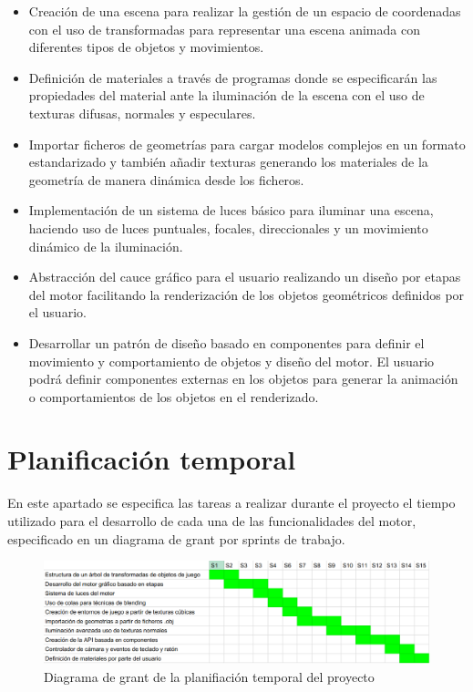 \documentclass[a4paper, 17pt]{book}
\begin{document}
\begin{itemize}
  \item Creación de una escena para realizar la gestión de un espacio de coordenadas con el uso de
  transformadas para representar una escena animada con diferentes tipos de objetos y movimientos.
  
  \item Definición de materiales a través de programas donde se especificarán las propiedades del
  material ante la iluminación de la escena con el uso de texturas difusas, normales y especulares.
  
  \item Importar ficheros de geometrías para cargar modelos complejos en un formato estandarizado
  y también añadir texturas generando los materiales de la geometría de manera dinámica desde los ficheros.
  
  \item Implementación de un sistema de luces básico para iluminar una escena, haciendo uso de luces
  puntuales, focales, direccionales y un movimiento dinámico de la iluminación.
  
  \item Abstracción del cauce gráfico para el usuario realizando un diseño por etapas del motor
  facilitando la renderización de los objetos geométricos definidos por el usuario.
  
  \item Desarrollar un patrón de diseño basado en componentes para definir el movimiento y
  comportamiento de objetos y diseño del motor. El usuario podrá definir componentes 
  externas en los objetos para generar la animación o comportamientos de los objetos en el renderizado.

\end{itemize}

\section{Planificación temporal}
\label{sec:planificacion-temporal}

En este apartado se especifica las tareas a realizar durante el proyecto el tiempo utilizado para el desarrollo de cada una 
de las funcionalidades del motor, especificado en un diagrama de grant por sprints de trabajo. 

\begin{figure}[H]
    \centering
    \includegraphics[scale=0.35, keepaspectratio]{img/Schedule.png}
    \caption{Diagrama de grant de la planifiación temporal del proyecto}
    \label{figura:khronos}
\end{figure}
\end{document}
